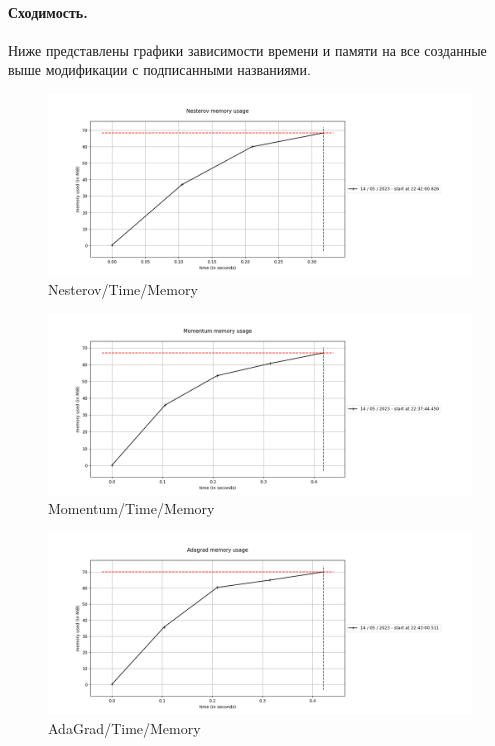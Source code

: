 \documentclass[12pt, a4paper, oneside, final]{article}
\begin{document}
	\paragraph{Сходимость.}
	Ниже представлены графики зависимости времени и памяти на все созданные выше модификации с подписанными названиями.
	\begin{figure}[H]
		\centering
		\includegraphics[scale = 0.6]{Image/T4_NESTEROV.png}
		\caption*{Nesterov/Time/Memory}
	\end{figure}
	\begin{figure}[H]
		\centering
		\includegraphics[scale = 0.6]{Image/T4_MOMENTUM.png}
		\caption*{Momentum/Time/Memory}
	\end{figure}
	\begin{figure}[H]
	\centering
	\includegraphics[scale = 0.6]{Image/T4_ADAGRAD.png}
	\caption*{AdaGrad/Time/Memory}
\end{figure}
\end{document}
